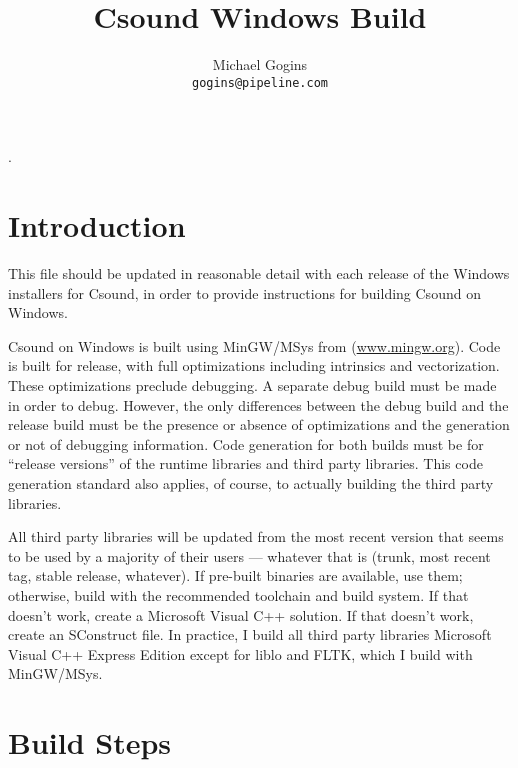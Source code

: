 \documentclass[11pt,letterpaper,onecolumn]{scrartcl}
\begin{document}
\begin{sloppypar}

.
\title{Csound Windows Build}
\author{Michael Gogins \\ \texttt{gogins@pipeline.com}}
\maketitle

\section{Introduction}
\label{sec:Introduction}

This file should be updated in reasonable detail with each release of the Windows installers for Csound, in order to provide instructions for building Csound on Windows.

Csound on Windows is built using MinGW/MSys from (\url{www.mingw.org}). Code is built for release, with full optimizations including intrinsics and vectorization. These optimizations preclude debugging. A separate debug build must be made in order to debug. However, the only differences between the debug build and the release build must be the presence or absence of optimizations and the generation or not of debugging information. Code generation for both builds must be for ``release versions'' of the runtime libraries and third party libraries. This code generation standard also applies, of course, to actually building the third party libraries.

All third party libraries will be updated from the most recent version that seems to be used by a majority of their users --- whatever that is (trunk, most recent tag, stable release, whatever). If pre-built binaries are available, use them; otherwise, build with the recommended toolchain and build system. If that doesn't work, create a Microsoft Visual C++ solution. If that doesn't work, create an SConstruct file. In practice, I build all third party libraries Microsoft Visual C++ Express Edition except for liblo and FLTK, which I build with MinGW/MSys.

\section{Build Steps}
\label{sec:BuildSteps}


\end{sloppypar}
\end{document}
